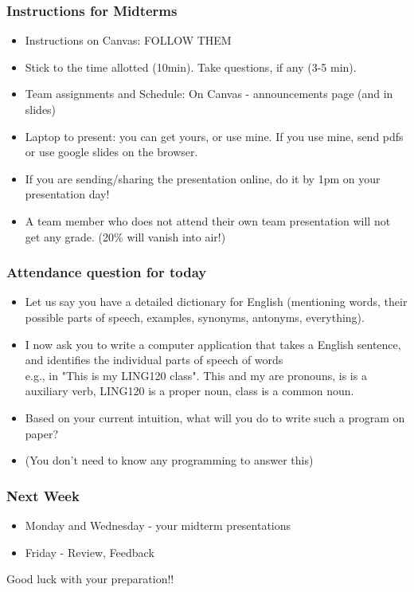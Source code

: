 \documentclass{beamer}
\begin{document}
\begin{frame}
\frametitle{Instructions for Midterms}
\begin{itemize}
\item Instructions on Canvas: FOLLOW THEM
\item Stick to the time allotted (10min). Take questions, if any (3-5 min).
\item Team assignments and Schedule: On Canvas - announcements page (and in slides) \pause
\item Laptop to present: you can get yours, or use mine. If you use mine, send pdfs or use google slides on the browser. 
\item If you are sending/sharing the presentation online, do it by 1pm on your presentation day!
\item A team member who does not attend their own team presentation will not get any grade. (20\% will vanish into air!)
\end{itemize}
\end{frame}

\begin{frame}
\frametitle{Attendance question for today}
\begin{itemize}
\item Let us say you have a detailed dictionary for English (mentioning words, their possible parts of speech, examples, synonyms, antonyms, everything).
\item I now ask you to write a computer application that takes a English sentence, and identifies the individual parts of speech of words
\\ e.g., in "This is my LING120 class". This and my are pronouns, is is a auxiliary verb, LING120 is a proper noun, class is a common noun. 
\item Based on your current intuition, what will you do to write such a program on paper? 
\item (You don't need to know any programming to answer this)
\end{itemize}
\end{frame}

\begin{frame}
\frametitle{Next Week}
\begin{itemize}
\item Monday and Wednesday - your midterm presentations
\item Friday - Review, Feedback
\end{itemize}
Good luck with your preparation!!
\end{frame}
\end{document}
